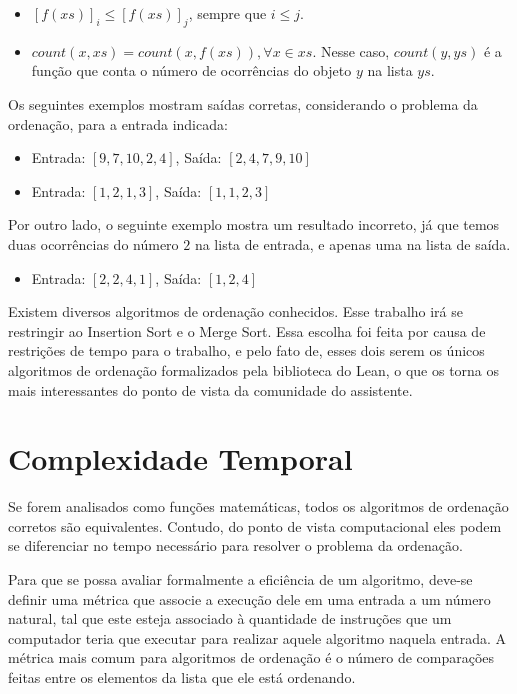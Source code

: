 \documentclass[12pt, oneside, a4paper,english,brazil]{abntex2}
\begin{document}
\begin{itemize}
  \item $[f(xs)]_{i} \le [f(xs)]_{j}$, sempre que $i \le j$.
  \item $count(x, xs) = count(x, f(xs)) ,  \forall x \in xs$. Nesse caso, $count(y, ys)$ \'e a fun\c{c}\~ao
        que conta o n\'umero de ocorr\^encias do objeto $y$ na lista $ys$.
\end{itemize}

\qquad Os seguintes exemplos mostram sa\'idas corretas, considerando o problema da ordena\c{c}\~ao, para a
entrada indicada:

\begin{itemize}
  \item Entrada: $[9, 7, 10, 2, 4]$, Sa\'ida: $[2, 4, 7, 9, 10]$
  \item Entrada: $[1, 2, 1, 3]$, Sa\'ida: $[1, 1, 2, 3]$
\end{itemize}

\qquad Por outro lado, o seguinte exemplo mostra um resultado incorreto, j\'a que temos duas ocorr\^encias
do n\'umero $2$ na lista de entrada, e apenas uma na lista de sa\'ida.

\begin{itemize}
  \item Entrada: $[2, 2, 4, 1]$, Sa\'ida: $[1, 2, 4]$
\end{itemize}

\qquad Existem diversos algoritmos de ordena\c{c}\~ao conhecidos. Esse trabalho ir\'a se restringir ao
Insertion Sort e o Merge Sort\cite{1}. Essa escolha foi feita por causa de restri\c{c}\~oes de tempo para
o trabalho, e pelo fato de, esses dois serem os \'unicos algoritmos de ordena\c{c}\~ao
formalizados pela biblioteca do Lean, o que os torna os mais interessantes do ponto de vista
da comunidade do assistente.

\section{Complexidade Temporal}

\qquad Se forem analisados como fun\c{c}\~oes matem\'aticas, todos os algoritmos de ordena\c{c}\~ao corretos
s\~ao equivalentes. Contudo, do ponto de vista computacional eles podem se diferenciar no tempo necess\'ario
para resolver o problema da ordena\c{c}\~ao.

\qquad Para que se possa avaliar formalmente a efici\^encia de um algoritmo, deve-se definir uma m\'etrica
que associe a execu\c{c}\~ao dele em uma entrada a um n\'umero natural, tal que este esteja associado \`a
quantidade de instru\c{c}\~oes que um computador teria que executar para realizar aquele algoritmo naquela
entrada. A m\'etrica mais comum para algoritmos de ordena\c{c}\~ao \'e o n\'umero de compara\c{c}\~oes feitas
entre os elementos da lista que ele est\'a ordenando.
\end{document}
